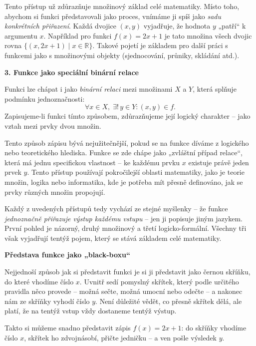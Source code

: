 \documentclass[12pt,a4paper]{article}
\begin{document}
Tento přístup už zdůrazňuje množinový základ celé matematiky.  
Místo toho, abychom si funkci představovali jako proces, 
vnímáme ji spíš jako \textit{sadu konkrétních přiřazení}.  
Každá dvojice \((x, y)\) vyjadřuje, že hodnota \(y\) „patří“ k argumentu \(x\).  
Například pro funkci \(f(x) = 2x + 1\) je tato množina všech dvojic rovna \(\{(x, 2x+1) \mid x \in \mathbb{R}\}\).  
Takové pojetí je základem pro další práci s funkcemi jako s množinovými objekty (sjednocování, průniky, skládání atd.).

\smallskip

\begin{definitionbox}
    \textbf{3. Funkce jako speciální binární relace}

    Funkci lze chápat i jako \emph{binární relaci} mezi množinami \(X\) a \(Y\), která splňuje podmínku jednoznačnosti:
    \[
    \forall x \in X, \; \exists! \, y \in Y : (x, y) \in f.
    \]
    Zapisujeme-li funkci tímto způsobem, zdůrazňujeme její logický charakter – jako vztah mezi prvky dvou množin.
\end{definitionbox}

Tento způsob zápisu bývá nejužitečnější, pokud se na funkce díváme z logického 
nebo teoretického hlediska.  
Funkce se zde chápe jako „zvláštní případ relace“, 
která má jednu specifickou vlastnost – ke každému prvku \(x\) 
existuje právě jeden prvek \(y\).  
Tento přístup používají pokročilejší oblasti matematiky, 
jako je teorie množin, logika nebo informatika, 
kde je potřeba mít přesně definováno, jak se prvky různých množin propojují.

\medskip
Každý z uvedených přístupů tedy vychází ze stejné myšlenky – že funkce \emph{jednoznačně přiřazuje výstup každému vstupu} – jen ji popisuje jiným jazykem.  
První pohled je názorný, druhý množinový a třetí logicko-formální.  
Všechny tři však vyjadřují tentýž pojem, který se stává základem celé matematiky.

\begin{notebox}
    \textbf{Představa funkce jako „black-boxu“}

    Nejjednoší způsob jak si představit funkci je si ji představit jako černou skříňku, do které vhodíme číslo \(x\).  
    Uvnitř sedí pomyslný skřítek, který podle určitého pravidla něco provede
     – možná sečte, možná umocní nebo odečte – 
     a nakonec nám ze skříňky vyhodí číslo \(y\).  
    Není důležité vědět, co přesně skřítek dělá, ale platí, 
    že na tentýž vstup vždy dostaneme tentýž výstup.  

    \medskip
    Takto si můžeme snadno představit zápis \( f(x) = 2x + 1 \):  
    do skříňky vhodíme číslo \(x\), skřítek ho zdvojnásobí, přičte jedničku – a ven pošle výsledek \(y\).
\end{notebox}
\end{document}

